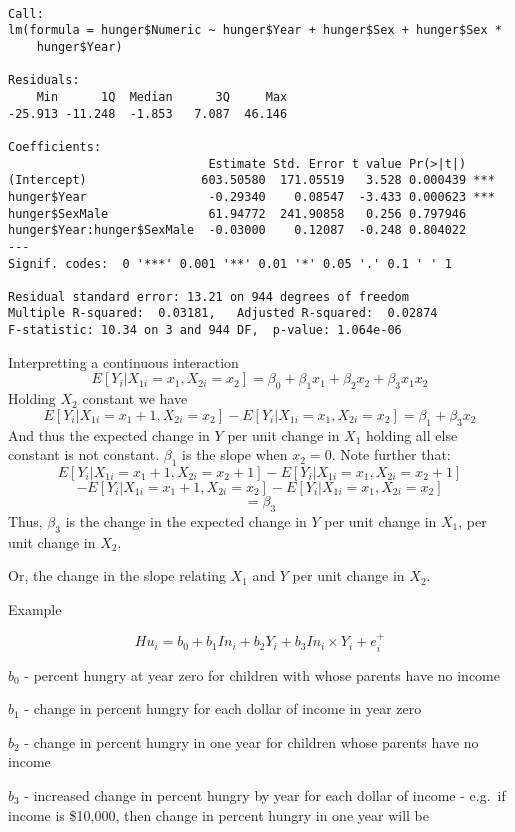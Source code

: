 \documentclass[12pt,]{04-class-files/abntex2}
\begin{document}
\begin{verbatim}

Call:
lm(formula = hunger$Numeric ~ hunger$Year + hunger$Sex + hunger$Sex * 
    hunger$Year)

Residuals:
    Min      1Q  Median      3Q     Max 
-25.913 -11.248  -1.853   7.087  46.146 

Coefficients:
                            Estimate Std. Error t value Pr(>|t|)    
(Intercept)                603.50580  171.05519   3.528 0.000439 ***
hunger$Year                 -0.29340    0.08547  -3.433 0.000623 ***
hunger$SexMale              61.94772  241.90858   0.256 0.797946    
hunger$Year:hunger$SexMale  -0.03000    0.12087  -0.248 0.804022    
---
Signif. codes:  0 '***' 0.001 '**' 0.01 '*' 0.05 '.' 0.1 ' ' 1

Residual standard error: 13.21 on 944 degrees of freedom
Multiple R-squared:  0.03181,	Adjusted R-squared:  0.02874 
F-statistic: 10.34 on 3 and 944 DF,  p-value: 1.064e-06
\end{verbatim}

Interpretting a continuous interaction
\[
E[Y_i | X_{1i}=x_1, X_{2i}=x_2] = \beta_0 + \beta_1 x_{1} + \beta_2 x_{2} + \beta_3 x_{1}x_{2}
\]
Holding \(X_2\) constant we have
\[
E[Y_i | X_{1i}=x_1+1, X_{2i}=x_2]-E[Y_i | X_{1i}=x_1, X_{2i}=x_2]
= \beta_1 + \beta_3 x_{2} 
\]
And thus the expected change in \(Y\) per unit change in \(X_1\) holding all else constant is not constant. \(\beta_1\) is the slope when \(x_{2} = 0\). Note further that:
\[
E[Y_i | X_{1i}=x_1+1, X_{2i}=x_2+1]-E[Y_i | X_{1i}=x_1, X_{2i}=x_2+1]
\]
\[
-E[Y_i | X_{1i}=x_1+1, X_{2i}=x_2]-E[Y_i | X_{1i}=x_1, X_{2i}=x_2]
\]
\[
=\beta_3  
\]
Thus, \(\beta_3\) is the change in the expected change in \(Y\) per unit change in \(X_1\), per unit change in \(X_2\).

Or, the change in the slope relating \(X_1\) and \(Y\) per unit change in \(X_2\).

Example

\[Hu_i = b_0 + b_1 In_i + b_2 Y_i + b_3 In_i \times Y_i + e^+_i\]

\(b_0\) - percent hungry at year zero for children with whose parents have no income

\(b_1\) - change in percent hungry for each dollar of income in year zero

\(b_2\) - change in percent hungry in one year for children whose parents have no income

\(b_3\) - increased change in percent hungry by year for each dollar of income - e.g.~if income is \$10,000, then change in percent hungry in one year will be
\end{document}
